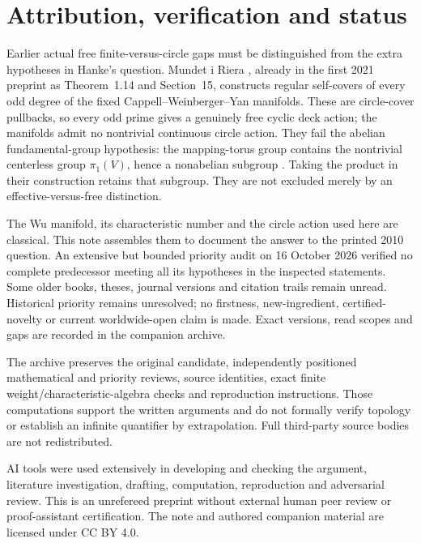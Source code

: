 \documentclass[10pt]{article}
\begin{document}
\section{Attribution, verification and status}
Earlier actual free finite-versus-circle gaps must be distinguished from
the extra hypotheses in Hanke's question.
Mundet i Riera \cite[Theorem~1.11, Section~13]{M}, already in the first
2021 preprint as Theorem~1.14 and Section~15, constructs regular self-covers
of every odd degree of the fixed Cappell--Weinberger--Yan manifolds.
These are circle-cover pullbacks, so every odd prime gives a genuinely
free cyclic deck action; the manifolds admit no nontrivial continuous circle action.
They fail the abelian fundamental-group hypothesis: the mapping-torus
group contains the nontrivial centerless group \(\pi_1(V)\), hence a
nonabelian subgroup \cite[Section~2, Step~4, manuscript p.~8]{CWY}.
Taking the product in their construction retains that subgroup.
They are not excluded merely by an effective-versus-free distinction.

The Wu manifold, its characteristic number and the circle action used here
are classical. This note assembles them to document the answer to the
printed 2010 question. An extensive but bounded priority audit on
16 October 2026 verified no complete predecessor meeting all its
hypotheses in the inspected statements. Some older books, theses,
journal versions and citation trails remain unread.
Historical priority remains unresolved; no firstness, new-ingredient,
certified-novelty or current worldwide-open claim is made.
Exact versions, read scopes and gaps are recorded in the companion archive.

The archive preserves the original candidate, independently positioned
mathematical and priority reviews, source identities, exact finite
weight/characteristic-algebra checks and reproduction instructions.
Those computations support the written arguments and do not formally
verify topology or establish an infinite quantifier by extrapolation.
Full third-party source bodies are not redistributed.

AI tools were used extensively in developing and checking the argument,
literature investigation, drafting, computation, reproduction and
adversarial review. This is an unrefereed preprint without external human
peer review or proof-assistant certification. The note and authored
companion material are licensed under CC BY 4.0.
\end{document}
